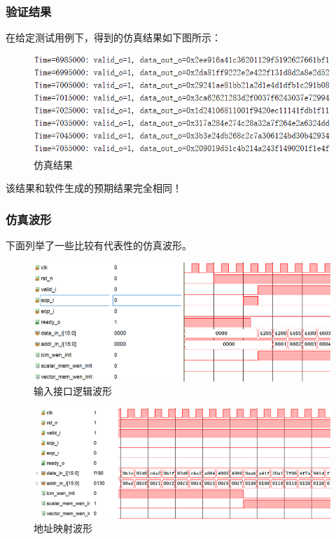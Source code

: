\documentclass{article}
\begin{document}
\subsubsection{验证结果}
在给定测试用例下，得到的仿真结果如下图所示：
\begin{figure}[!ht]
    \centering
    \includegraphics[width = \textwidth]{Sim2.png}
    \caption{仿真结果}
\end{figure}

该结果和软件生成的预期结果完全相同！

\subsubsection{仿真波形}
下面列举了一些比较有代表性的仿真波形。
\begin{figure}[!ht]
    \centering
    \includegraphics[width = \textwidth]{Input_Interface_Logic.png}
    \caption{输入接口逻辑波形}
\end{figure}

\begin{figure}[!ht]
    \centering
    \includegraphics[width = \textwidth]{Addr_Map_Sim.png}
    \caption{地址映射波形}
\end{figure}
\end{document}
